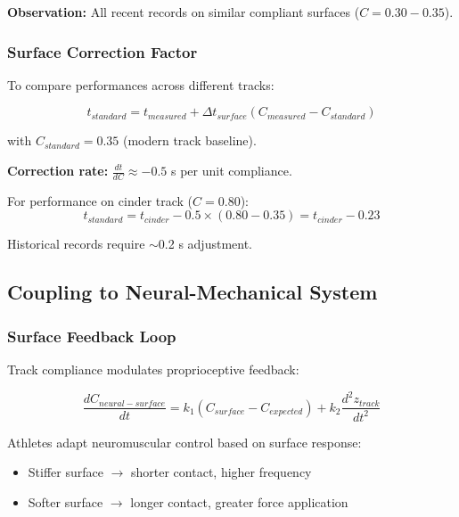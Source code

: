 \textbf{Observation:} All recent records on similar compliant surfaces ($C = 0.30-0.35$).

\subsubsection{Surface Correction Factor}

To compare performances across different tracks:

\begin{equation}
t_{standard} = t_{measured} + \Delta t_{surface}(C_{measured} - C_{standard})
\label{eq:surface_correction}
\end{equation}

with $C_{standard} = 0.35$ (modern track baseline).

\textbf{Correction rate:} $\frac{dt}{dC} \approx -0.5$ s per unit compliance.

For performance on cinder track ($C = 0.80$):
\begin{equation}
t_{standard} = t_{cinder} - 0.5 \times (0.80 - 0.35) = t_{cinder} - 0.23
\label{eq:cinder_correction}
\end{equation}

Historical records require $\sim$0.2 s adjustment.

\subsection{Coupling to Neural-Mechanical System}

\subsubsection{Surface Feedback Loop}

Track compliance modulates proprioceptive feedback:

\begin{equation}
\frac{dC_{neural-surface}}{dt} = k_1(C_{surface} - C_{expected}) + k_2 \frac{d^2z_{track}}{dt^2}
\label{eq:surface_neural_coupling}
\end{equation}

Athletes adapt neuromuscular control based on surface response:
\begin{itemize}
\item Stiffer surface $\to$ shorter contact, higher frequency
\item Softer surface $\to$ longer contact, greater force application
\end{itemize}

